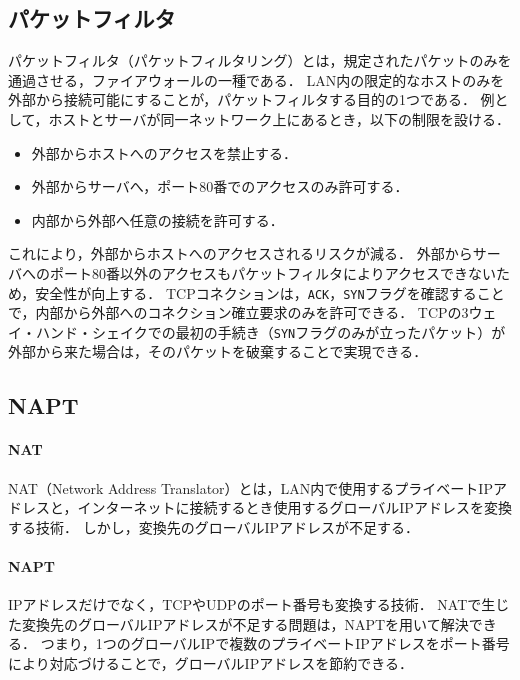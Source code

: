 \subsection{パケットフィルタ}
パケットフィルタ（パケットフィルタリング）とは，規定されたパケットのみを通過させる，ファイアウォールの一種である．
LAN内の限定的なホストのみを外部から接続可能にすることが，パケットフィルタする目的の1つである．
例として，ホストとサーバが同一ネットワーク上にあるとき，以下の制限を設ける．
\begin{itemize}
    \item 外部からホストへのアクセスを禁止する．
    \item 外部からサーバへ，ポート80番でのアクセスのみ許可する．
    \item 内部から外部へ任意の接続を許可する．
\end{itemize}
これにより，外部からホストへのアクセスされるリスクが減る．
外部からサーバへのポート80番以外のアクセスもパケットフィルタによりアクセスできないため，安全性が向上する．
TCPコネクションは，\texttt{ACK}，\texttt{SYN}フラグを確認することで，内部から外部へのコネクション確立要求のみを許可できる．
TCPの3ウェイ・ハンド・シェイクでの最初の手続き（\texttt{SYN}フラグのみが立ったパケット）が外部から来た場合は，そのパケットを破棄することで実現できる\cite[p.343]{マスタリングTCPIP}．
\subsection{NAPT}
\paragraph{NAT}
NAT（Network Address Translator）とは，LAN内で使用するプライベートIPアドレスと，インターネットに接続するとき使用するグローバルIPアドレスを変換する技術．
しかし，変換先のグローバルIPアドレスが不足する．
\paragraph{NAPT}
IPアドレスだけでなく，TCPやUDPのポート番号も変換する技術．
NATで生じた変換先のグローバルIPアドレスが不足する問題は，NAPTを用いて解決できる．
つまり，1つのグローバルIPで複数のプライベートIPアドレスをポート番号により対応づけることで，グローバルIPアドレスを節約できる．
